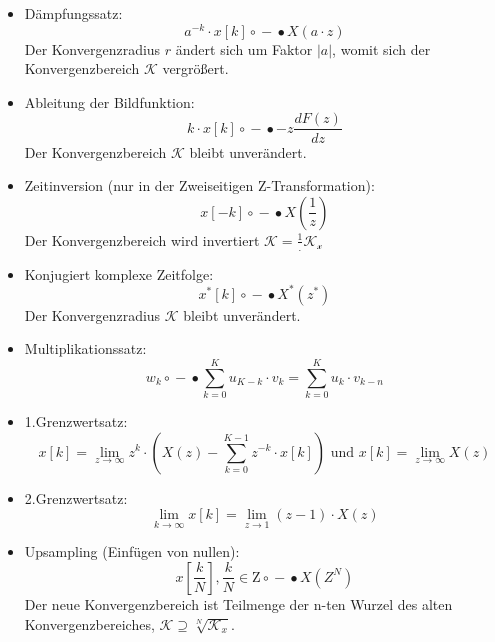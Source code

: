\documentclass[11pt]{article}
\providecommand{\tightlist}{%
      \setlength{\itemsep}{0pt}\setlength{\parskip}{0pt}}
\begin{document}
\begin{itemize}
\tightlist
\item
  Dämpfungssatz:
  \[a^{-k} \cdot x[k] \circ \!\!-\!\!\bullet X(a \cdot z)\] Der
  Konvergenzradius \(r\) ändert sich um Faktor \(|a|\), womit sich der
  Konvergenzbereich \(\mathcal{K}\) vergrößert.
\end{itemize}

    \begin{itemize}
\tightlist
\item
  Ableitung der Bildfunktion:
  \[k \cdot x[k] \circ \!\!-\!\!\bullet -z \frac{dF(z)}{dz}\] Der
  Konvergenzbereich \(\mathcal{K}\) bleibt unverändert.
\end{itemize}

    \begin{itemize}
\tightlist
\item
  Zeitinversion (nur in der Zweiseitigen Z-Transformation):
  \[x[-k] \circ \!\!-\!\!\bullet X(\frac{1}{z})\] Der Konvergenzbereich
  wird invertiert \(\mathcal{K} = \frac{1}.{\mathcal{K_x}}\)
\end{itemize}

    \begin{itemize}
\tightlist
\item
  Konjugiert komplexe Zeitfolge:
  \[x^{*}[k] \circ \!\!-\!\!\bullet X^{*}(z^{*})\] Der Konvergenzradius
  \(\mathcal{K}\) bleibt unverändert.
\end{itemize}

    \begin{itemize}
\tightlist
\item
  Multiplikationssatz:
  \[w_k \circ \!\!-\!\!\bullet \sum_{k=0}^K u_{K-k} \cdot v_k = \sum_{k=0}^K u_{k} \cdot v_{k-n}\]
\end{itemize}

    \begin{itemize}
\item
  1.Grenzwertsatz:
  \[x[k] = \lim_{z\to\infty} z^k \cdot (X(z) - \sum_{k=0}^{K-1} z^{-k} \cdot x[k]) \textrm{ und } x[k] = \lim_{z\to\infty} X(z)\]
\item
  2.Grenzwertsatz:
  \[\lim_{k\to\infty} x[k] = \lim_{z\to 1} (z-1)\cdot X(z)\]
\end{itemize}

    \begin{itemize}
\tightlist
\item
  Upsampling (Einfügen von nullen):
  \[x[\frac{k}{N}], \frac{k}{N} \in\mathrm{Z} \circ \!\!-\!\!\bullet X(Z^N)\]
  Der neue Konvergenzbereich ist Teilmenge der n-ten Wurzel des alten
  Konvergenzbereiches,
  \(\mathcal{K} \supseteq \sqrt[N]{\mathcal{K}_x}\).
\end{itemize}
\end{document}

